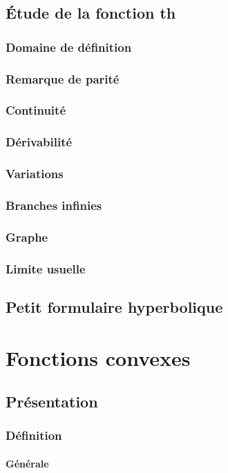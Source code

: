 \documentclass[12pt,a4paper,french]{book}
\begin{document}
	\section{Étude de la fonction th}
		\subsection{Domaine de définition}
		\subsection{Remarque de parité}
		\subsection{Continuité}
		\subsection{Dérivabilité}
		\subsection{Variations}
		\subsection{Branches infinies}
		\subsection{Graphe}
		\subsection{Limite usuelle}
	\section{Petit formulaire hyperbolique}
\chapter{Fonctions convexes}
	\section{Présentation}
		\subsection{Définition}
			\subsubsection{Générale}
\end{document}
